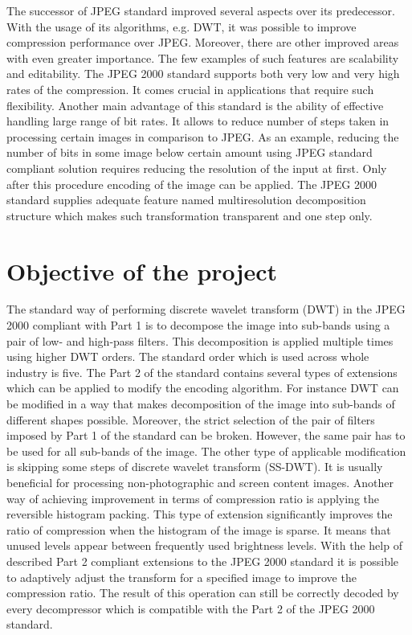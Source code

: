 The successor of JPEG standard improved several aspects over its predecessor. With the usage of its algorithms,
e.g. DWT, it was possible to improve compression performance over JPEG. Moreover, there are other improved areas
with even greater importance. The few examples of such features are scalability and editability. \cite{jpeg2000}
The JPEG 2000 standard supports both very low and very high rates of the compression. It comes crucial
in applications that require such flexibility. Another main advantage of this standard is the ability of
effective handling large range of bit rates. It allows to reduce number of steps taken in processing
certain images in comparison to JPEG. As an example, reducing the number of bits in some image below certain
amount using JPEG standard compliant solution requires reducing the resolution of the input at first.
Only after this procedure encoding of the image can be applied. The JPEG 2000 standard supplies adequate feature
named multiresolution decomposition structure which makes such transformation transparent and one step only. \cite{jpeg2000}


\section{Objective of the project}

The standard way of performing discrete wavelet transform (DWT) in the JPEG 2000 compliant with Part 1 is to decompose
the image into sub-bands using a pair of low- and high-pass filters. This decomposition is applied multiple times using
higher DWT orders. The standard order which is used across whole industry is five. \cite{jpeg_suite} \cite{jpeg_summary}
The Part 2 of the standard contains several types of extensions which can be applied to modify the encoding
algorithm. For instance DWT can be modified in a way that makes decomposition of the image into sub-bands of different
shapes possible. Moreover, the strict selection of the pair of filters imposed by Part 1 of the standard can be
broken. However, the same pair has to be used for all sub-bands of the image. \cite{jpeg_suite} The other type of applicable
modification is skipping some steps of discrete wavelet transform (SS-DWT). It is usually beneficial for processing
non-photographic and screen content images. Another way of achieving improvement in terms of compression ratio is
applying the reversible histogram packing. This type of extension significantly improves the ratio of compression
when the histogram of the image is sparse. It means that unused levels appear between frequently used brightness levels.
With the help of described Part 2 compliant extensions to the JPEG 2000 standard it is possible to adaptively
adjust the transform for a specified image to improve the compression ratio. The result of this operation can still
be correctly decoded by every decompressor which is compatible with the Part 2 of the JPEG 2000 standard.


